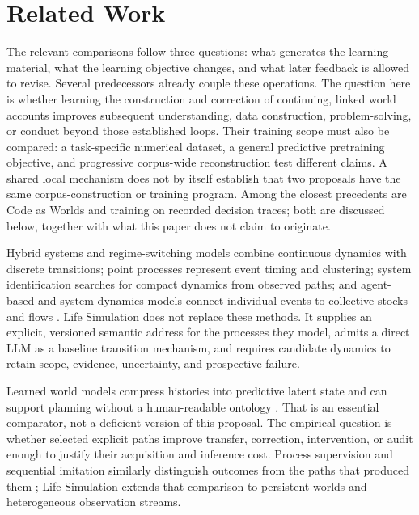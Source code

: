 \documentclass[10pt]{article}
\begin{document}
\section{Related Work}
\label{sec:related}

The relevant comparisons follow three questions: what generates the learning
material, what the learning objective changes, and what later feedback is
allowed to revise. Several predecessors already couple these operations.
The question here is whether learning the construction and correction of
continuing, linked world accounts improves subsequent understanding, data
construction, problem-solving, or conduct beyond those established loops.
Their training scope must also be compared: a task-specific numerical dataset,
a general predictive pretraining objective, and progressive corpus-wide
reconstruction test different claims. A shared local mechanism does not by
itself establish that two proposals have the same corpus-construction or training program. Among the closest precedents are
Code as Worlds and training on recorded decision traces; both are discussed below,
together with what this paper does not claim to originate.

Hybrid systems and regime-switching models combine continuous dynamics with
discrete transitions; point processes represent event timing and clustering;
system identification searches for compact dynamics from observed paths; and
agent-based and system-dynamics models connect individual events to collective
stocks and flows
\cite{goebel2009hybrid,hawkes1971,brunton2016sindy,
epsteinAxtell1996artificialSocieties,forrester1961industrialDynamics}.
Life Simulation does not replace these methods. It supplies an explicit,
versioned semantic address for the processes they model, admits a direct LLM as
a baseline transition mechanism, and requires candidate dynamics to retain
scope, evidence, uncertainty, and prospective failure.

Learned world models compress histories into predictive latent state and can
support planning without a human-readable ontology
\cite{haSchmidhuber2018worldModels,hafner2025dreamer,
schrittwieser2020muzero}. That is an essential comparator, not a deficient
version of this proposal. The empirical question is whether selected explicit
paths improve transfer, correction, intervention, or audit enough to justify
their acquisition and inference cost. Process supervision and sequential
imitation similarly distinguish outcomes from the paths that produced them
\cite{lightman2023verify,ross2011dagger}; Life Simulation extends that
comparison to persistent worlds and heterogeneous observation streams.
\end{document}
